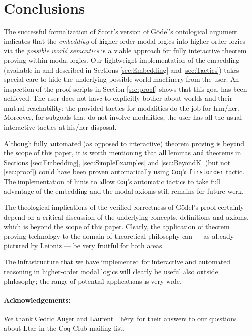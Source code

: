 \documentclass{llncs}
\newcommand{\Coq}{\texttt{Coq}\xspace}
\begin{document}
\section{Conclusions}
\label{sec:conclusions}

The successful formalization of Scott's version of  G\"odel's
ontological argument indicates that the \emph{embedding} of
higher-order modal
logics into higher-order logics via the \emph{possible world
semantics} is a viable approach for fully interactive theorem proving
within modal logics. Our lightweight implementation of the embedding
(available in \cite{FormalTheologyRepository} and described 
in Sections \ref{sec:Embedding} and \ref{sec:Tactics})
takes special care to hide the underlying possible world machinery
from the user. An inspection of the proof scripts in Section
\ref{sec:proof} shows that this goal has been achieved. The user does
not have to explicitly bother about worlds and their mutual
reachability; the provided tactics for modalities do the job for
him/her. Moreover, for subgoals that do not involve modalities, the
user has all the usual interactive tactics at his/her disposal.

Although fully automated (as opposed to interactive) theorem proving
is beyond the scope of this paper, it is worth mentioning that all
lemmas and theorems in Sections \ref{sec:Embedding},
\ref{sec:SimpleExamples} and \ref{sec:BeyondK} (but not \ref{sec:proof}) could have been proven
automatically using \Coq's \texttt{firstorder} tactic. The
implementation of hints to allow \Coq's automatic tactics to take full
advantage of the embedding and the modal axioms still remains for
future work. 

The theological implications of the verified correctness of G\"odel's
proof certainly depend on a critical discussion of the underlying
concepts, definitions and axioms, which is beyond the scope of this
paper.  Clearly, the application of theorem proving technology to the
domain of theoretical philosophy can --- as already pictured by
Leibniz --- be very fruitful for both areas. 

The infrastructure that we have implemented for interactive and
automated reasoning in higher-order modal logics will clearly be
useful also outside philosophy; the range of potential applications is very wide. 


\paragraph{Acknowledgements:} We thank Cedric Auger and Laurent Th\'ery, 
for their answers to our questions about Ltac in the Coq-Club mailing-list. 
\end{document}
